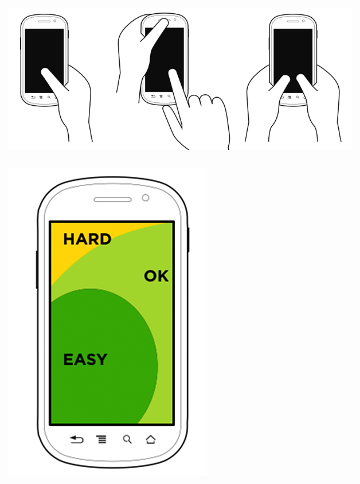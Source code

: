 \begin{figure}[H]
        \centering
        \begin{subfigure}[b]{0.6\textwidth}
                \centering
                \includegraphics[width=\textwidth]{img/tnav-touch-phones.png}
        \end{subfigure}%
        \begin{subfigure}[b]{0.2\textwidth}
                \centering
                \includegraphics[width=\textwidth]{img/tnav-touch-phones2.png}
        \end{subfigure}


\end{figure}
